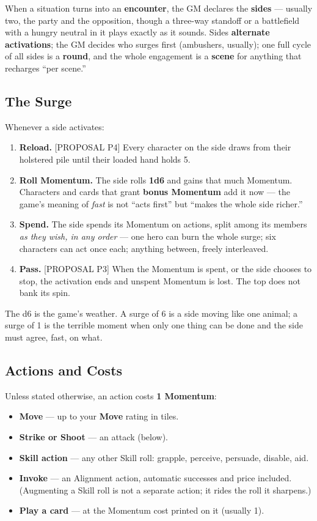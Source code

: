 When a situation turns into an \textbf{encounter}, the GM declares the \textbf{sides} --- usually two, the party and the opposition, though a three-way standoff or a battlefield with a hungry neutral in it plays exactly as it sounds. Sides \textbf{alternate activations}; the GM decides who surges first (ambushers, usually); one full cycle of all sides is a \textbf{round}, and the whole engagement is a \textbf{scene} for anything that recharges ``per scene.''

\subsection{The Surge}

Whenever a side activates:

\begin{enumerate}
    \item \textbf{Reload.} [PROPOSAL P4] Every character on the side draws from their holstered pile until their loaded hand holds 5.
    \item \textbf{Roll Momentum.} The side rolls \textbf{1d6} and gains that much Momentum. Characters and cards that grant \textbf{bonus Momentum} add it now --- the game's meaning of \textit{fast} is not ``acts first'' but ``makes the whole side richer.''
    \item \textbf{Spend.} The side spends its Momentum on actions, split among its members \textit{as they wish, in any order} --- one hero can burn the whole surge; six characters can act once each; anything between, freely interleaved.
    \item \textbf{Pass.} [PROPOSAL P3] When the Momentum is spent, or the side chooses to stop, the activation ends and unspent Momentum is lost. The top does not bank its spin.
\end{enumerate}

The d6 is the game's weather. A surge of 6 is a side moving like one animal; a surge of 1 is the terrible moment when only one thing can be done and the side must agree, fast, on what.

\subsection{Actions and Costs}

Unless stated otherwise, an action costs \textbf{1 Momentum}:

\begin{itemize}
    \item \textbf{Move} --- up to your \textbf{Move} rating in tiles.
    \item \textbf{Strike or Shoot} --- an attack (below).
    \item \textbf{Skill action} --- any other Skill roll: grapple, perceive, persuade, disable, aid.
    \item \textbf{Invoke} --- an Alignment action, automatic successes and price included. (Augmenting a Skill roll is not a separate action; it rides the roll it sharpens.)
    \item \textbf{Play a card} --- at the Momentum cost printed on it (usually 1).
\end{itemize}

